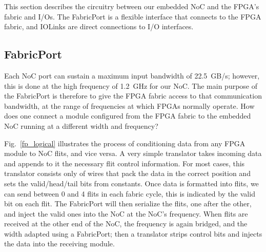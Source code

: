 %
%
%
%

This section describes the circuitry between our embedded NoC and the FPGA's fabric and I/Os.
The FabricPort is a flexible interface that connects to the FPGA fabric, and IOLinks are direct connections to I/O interfaces.

%
\subsection{FabricPort}
%

Each NoC port can sustain a maximum input bandwidth of 22.5~GB/s; however, this is done at the high frequency of 1.2~GHz for our NoC.
The main purpose of the FabricPort is therefore to give the FPGA fabric access to that communication bandwidth, at the range of frequencies at which FPGAs normally operate.
How does one connect a module configured from the FPGA fabric to the embedded NoC running at a different width and frequency?

%
%

Fig.~\ref{fp_logical} illustrates the process of conditioning data from any FPGA module to NoC flits, and vice versa.
A very simple translator takes incoming data and appends to it the necessary flit control information.
For most cases, this translator consists only of wires that pack the data in the correct position and sets the valid/head/tail bits from constants.
Once data is formatted into flits, we can send between 0 and 4 flits in each fabric cycle, this is indicated by the valid bit on each flit.
The FabricPort will then serialize the flits, one after the other, and inject the valid ones into the NoC at the NoC's frequency.
When flits are received at the other end of the NoC, the frequency is again bridged, and the width adapted using a FabricPort; then a translator strips control bits and injects the data into the receiving module.

